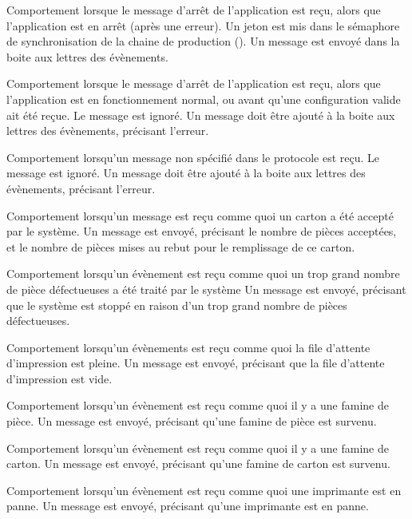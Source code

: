 {Comportement lorsque le message d'arrêt de l'application est reçu, alors que
    l'application est en arrêt (après une erreur).}
{Un jeton est mis dans le sémaphore de synchronisation de la chaine de
    production (). Un message est envoyé dans la boite
	aux lettres des évènements.}

{Comportement lorsque le message d'arrêt de l'application est reçu, alors que
    l'application est en fonctionnement normal, ou avant qu'une configuration
	valide ait été reçue.}
{Le message est ignoré. Un message doit être ajouté à la boite aux lettres des
    évènements, précisant l'erreur.}

{Comportement lorsqu'un message non spécifié dans le protocole est reçu.}
{Le message est ignoré. Un message doit être ajouté à la boite aux lettres des
    évènements, précisant l'erreur.}

{Comportement lorsqu'un message est reçu comme quoi un carton a été accepté par le système.}
{Un message est envoyé, précisant le nombre de pièces acceptées, et le nombre de
    pièces mises au rebut pour le remplissage de ce carton.}

{Comportement lorsqu'un évènement est reçu comme quoi un trop grand nombre de
    pièce défectueuses a été traité par le système}
{Un message est envoyé, précisant que le système est stoppé en raison d'un trop
    grand nombre de pièces défectueuses.}

{Comportement lorsqu'un évènements est reçu comme quoi la file d'attente
    d'impression est pleine.}
{Un message est envoyé, précisant que la file d'attente d'impression est vide.}

{Comportement lorsqu'un évènement est reçu comme quoi il y a une famine de
    pièce.}
{Un message est envoyé, précisant qu'une famine de pièce est survenu.}

{Comportement lorsqu'un évènement est reçu comme quoi il y a une famine de
    carton.}
{Un message est envoyé, précisant qu'une famine de carton est survenu.}


{Comportement lorsqu'un évènement est reçu comme quoi une imprimante est en
    panne.}
{Un message est envoyé, précisant qu'une imprimante est en panne.}

